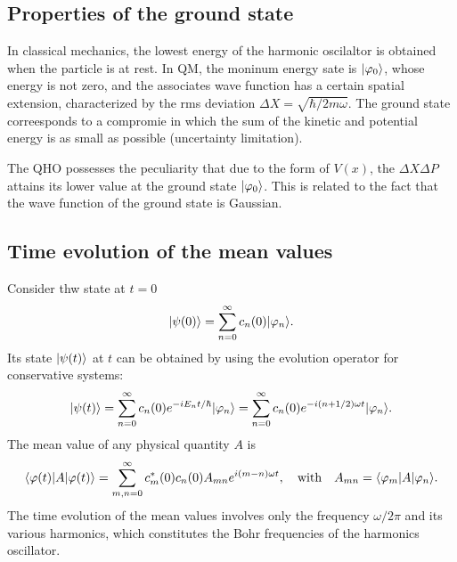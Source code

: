 \subsection{Properties of the ground state}
In classical mechanics, the lowest energy of the harmonic oscilaltor is obtained when the particle is at rest. In QM, the moninum energy sate is $|\varphi_0\rangle$, whose energy 
is not zero, and the associates wave function has a certain spatial extension, characterized by the rms deviation $\Delta X=\sqrt{\hbar/2m\omega}$.
The ground state correesponds to a compromie in which the sum of the kinetic and potential energy is as small as possible (uncertainty limitation).

\begin{emphasizer}
    The QHO possesses the peculiarity that due to the form of $V(x)$, the $\Delta X\Delta P$ attains its lower value at the ground state $|\varphi_0\rangle$. This is related to 
    the fact that the wave function of the ground state is Gaussian.
\end{emphasizer}

\subsection{Time evolution of the mean values}
Consider thw state at $t=0$ 
\begin{align*}
    |\psi(0)\rangle=\sum_{n=0}^\infty c_n(0)|\varphi_n\rangle.
\end{align*}
Its state $|\psi(t)\rangle$ at $t$ can be obtained by using the evolution operator for conservative systems:
\begin{align}
    |\psi(t)\rangle=\sum_{n=0}^\infty c_n(0)e^{-iE_nt/\hbar}|\varphi_n\rangle=\sum_{n=0}^\infty c_n(0)e^{-i(n+1/2)\omega t}|\varphi_n\rangle.
\end{align}
The mean value of any physical quantity $A$ is 
\begin{align*}
    \langle\varphi(t)|A|\varphi(t)\rangle=\sum_{m,n=0}^\infty c_m^*(0)c_n(0)A_{mn}e^{i(m-n)\omega t},\quad\text{with}\quad A_{mn}=\langle\varphi_m|A|\varphi_n\rangle.
\end{align*}
The time evolution of the mean values involves only the frequency $\omega/2\pi$ and its various harmonics, which constitutes the Bohr frequencies of the harmonics oscillator.

